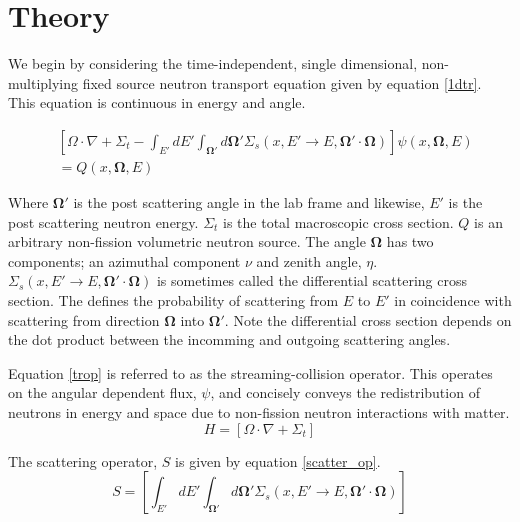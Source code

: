 \section{Theory}

We begin by considering the time-independent, single dimensional, non-multiplying fixed source neutron transport equation given by equation \ref{1dtr}.  This equation is continuous in energy and angle.

\begin{eqnarray}
& \left[ \Omega \cdot \nabla + \Sigma_t -
\int_{E'} dE' \int_{\mathbf\Omega'} d \mathbf\Omega'
\Sigma_s \left(x, E' \rightarrow E , \mathbf\Omega' \cdot \mathbf\Omega \right) \right] 
\psi(x, \mathbf\Omega, E)  \nonumber \\
& =
Q(x, \mathbf\Omega, E)
\label{1dtr}
\end{eqnarray}

Where $\mathbf\Omega'$ is the post scattering angle in the lab frame and likewise, $E'$ is the post scattering neutron energy.  $\Sigma_t$ is the total macroscopic cross section.  $Q$ is an arbitrary non-fission volumetric neutron source.  The angle $\mathbf\Omega$ has two components; an azimuthal component $\nu$ and zenith angle, $\eta$.
$\Sigma_s \left(x, E' \rightarrow E , \mathbf\Omega' \cdot \mathbf\Omega \right)$ is sometimes called the differential scattering cross section.  The defines the probability of scattering from $E$ to $E'$ in coincidence with scattering from direction $\mathbf\Omega$ into $\mathbf\Omega'$.  Note the differential cross section depends on the dot product between the incomming and outgoing scattering angles.  

Equation \ref{trop} is referred to as the streaming-collision operator.  This operates on the angular dependent flux, $\psi$, and concisely conveys the redistribution of neutrons in energy and space due to non-fission neutron interactions with matter.
\begin{equation}
H = \left[ \Omega \cdot \nabla + \Sigma_t 
 \right]
\label{trop}
\end{equation}

The scattering operator, $S$ is given by equation \ref{scatter_op}.
\begin{equation}
S = \left[ 
\int_{E'} dE' \int_{\mathbf\Omega'} d \mathbf\Omega'
\Sigma_s \left(x, E' \rightarrow E , \mathbf\Omega' \cdot \mathbf\Omega \right)
 \right]
\label{trop}
\end{equation}


